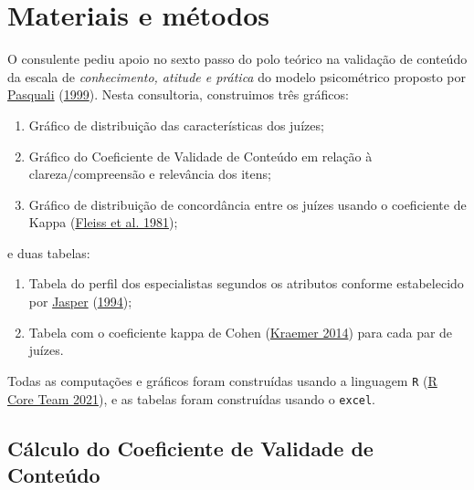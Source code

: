 \documentclass[
]{article}
\providecommand{\tightlist}{%
  \setlength{\itemsep}{0pt}\setlength{\parskip}{0pt}}
\begin{document}
\hypertarget{materiais-e-muxe9todos}{%
\section{Materiais e métodos}\label{materiais-e-muxe9todos}}

O consulente pediu apoio no sexto passo do polo teórico na validação de conteúdo da escala de \emph{conhecimento, atitude e prática } do modelo psicométrico proposto por \protect\hyperlink{ref-pasquali1999elaboraccao}{Pasquali} (\protect\hyperlink{ref-pasquali1999elaboraccao}{1999}). Nesta consultoria, construimos três gráficos:

\begin{enumerate}
\def\labelenumi{\arabic{enumi}.}
\tightlist
\item
  Gráfico de distribuição das características dos juízes;
\item
  Gráfico do Coeficiente de Validade de Conteúdo em relação à clareza/compreensão e relevância dos itens;
\item
  Gráfico de distribuição de concordância entre os juízes usando o coeficiente de Kappa (\protect\hyperlink{ref-fleiss1981measurement}{Fleiss et al. 1981});
\end{enumerate}

e duas tabelas:

\begin{enumerate}
\def\labelenumi{\arabic{enumi}.}
\tightlist
\item
  Tabela do perfil dos especialistas segundos os atributos conforme estabelecido por \protect\hyperlink{ref-jasper1994expert}{Jasper} (\protect\hyperlink{ref-jasper1994expert}{1994});
\item
  Tabela com o coeficiente kappa de Cohen (\protect\hyperlink{ref-kraemer2014kappa}{Kraemer 2014}) para cada par de juízes.
\end{enumerate}

Todas as computações e gráficos foram construídas usando a linguagem \texttt{R} (\protect\hyperlink{ref-Rlang}{R Core Team 2021}), e as tabelas foram construídas usando o \texttt{excel}.

\hypertarget{cuxe1lculo-do-coeficiente-de-validade-de-conteuxfado}{%
\subsection{Cálculo do Coeficiente de Validade de Conteúdo}\label{cuxe1lculo-do-coeficiente-de-validade-de-conteuxfado}}
\end{document}
